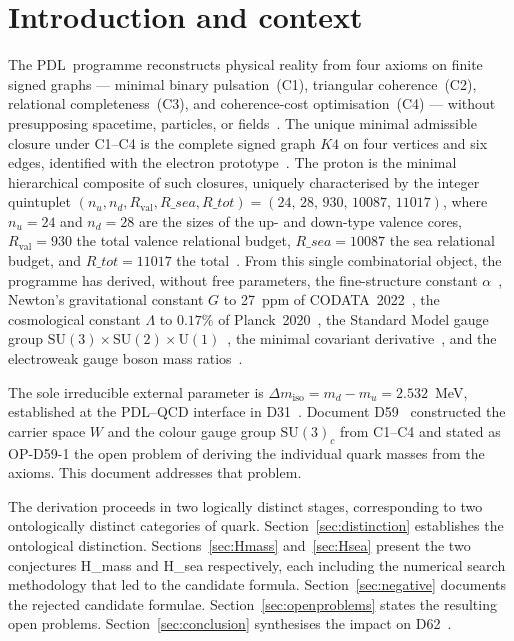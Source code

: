 \documentclass[12pt,a4paper]{article}
\def\PDL{PDL}
\def\Kfour{K4}
\def\Rsea{R\_sea}
\def\Rtot{R\_tot}
\theoremstyle{plain}
\theoremstyle{definition}
\theoremstyle{remark}
\newcommand{\PDL}{\textnormal{PDL}}
\newcommand{\Kfour}{K_4}
\newcommand{\quintuplet}{(24,\,28,\,930,\,10087,\,11017)}
\newcommand{\nnu}{n_u}
\newcommand{\nnd}{n_d}
\newcommand{\Rval}{R_{\mathrm{val}}}
\newcommand{\Rsea}{R_{\mathrm{sea}}}
\newcommand{\Rtot}{R_{\mathrm{tot}}}
\newcommand{\Dmiso}{\Delta m_{\mathrm{iso}}}
\newcommand{\mup}{m_u}
\newcommand{\mdown}{m_d}
\begin{document}
\clearpage

\tableofcontents
\newpage

\section{Introduction and context}
\label{sec:intro}

The \PDL\ programme reconstructs physical reality from four axioms on finite signed graphs --- minimal binary pulsation~(C1), triangular coherence~(C2), relational completeness~(C3), and coherence-cost optimisation~(C4) --- without presupposing spacetime, particles, or fields~\cite{D01,D43}. The unique minimal admissible closure under C1--C4 is the complete signed graph $\Kfour$ on four vertices and six edges, identified with the electron prototype~\cite{D01}. The proton is the minimal hierarchical composite of such closures, uniquely characterised by the integer quintuplet $(\nnu, \nnd, \Rval, \Rsea, \Rtot) = \quintuplet$, where $\nnu = 24$ and $\nnd = 28$ are the sizes of the up- and down-type valence cores, $\Rval = 930$ the total valence relational budget, $\Rsea = 10087$ the sea relational budget, and $\Rtot = 11017$ the total~\cite{D16a,D16b,D47}. From this single combinatorial object, the programme has derived, without free parameters, the fine-structure constant $\alpha$~\cite{D12,D25}, Newton's gravitational constant $G$ to 27~ppm of CODATA~2022~\cite{D21,D28}, the cosmological constant $\Lambda$ to $0.17\%$ of Planck~2020~\cite{D51,D52,D53}, the Standard Model gauge group $\mathrm{SU}(3)\times\mathrm{SU}(2)\times\mathrm{U}(1)$~\cite{D57,D58,D59,D60}, the minimal covariant derivative~\cite{D61}, and the electroweak gauge boson mass ratios~\cite{D62}.

The sole irreducible external parameter is $\Dmiso = \mdown - \mup = 2.532$~MeV, established at the \PDL--QCD interface in D31~\cite{D31}. Document D59~\cite{D59} constructed the carrier space $W$ and the colour gauge group $\mathrm{SU}(3)_c$ from C1--C4 and stated as OP-D59-1 the open problem of deriving the individual quark masses from the axioms. This document addresses that problem.

The derivation proceeds in two logically distinct stages, corresponding to two ontologically distinct categories of quark. Section~\ref{sec:distinction} establishes the ontological distinction. Sections~\ref{sec:Hmass} and~\ref{sec:Hsea} present the two conjectures H\_mass and H\_sea respectively, each including the numerical search methodology that led to the candidate formula. Section~\ref{sec:negative} documents the rejected candidate formulae. Section~\ref{sec:openproblems} states the resulting open problems. Section~\ref{sec:conclusion} synthesises the impact on D62~\cite{D62}.
\end{document}
